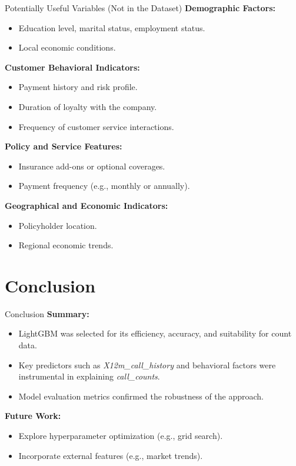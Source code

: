 \documentclass{beamer}\usepackage[]{graphicx}\usepackage[]{xcolor}
\begin{document}
\begin{frame}{Potentially Useful Variables (Not in the Dataset)}
\textbf{Demographic Factors:}
\begin{itemize}
    \item Education level, marital status, employment status.
    \item Local economic conditions.
\end{itemize}

\textbf{Customer Behavioral Indicators:}
\begin{itemize}
    \item Payment history and risk profile.
    \item Duration of loyalty with the company.
    \item Frequency of customer service interactions.
\end{itemize}

\textbf{Policy and Service Features:}
\begin{itemize}
    \item Insurance add-ons or optional coverages.
    \item Payment frequency (e.g., monthly or annually).
\end{itemize}

\textbf{Geographical and Economic Indicators:}
\begin{itemize}
    \item Policyholder location.
    \item Regional economic trends.
\end{itemize}
\end{frame}


\section{Conclusion}

\begin{frame}{Conclusion}
\textbf{Summary:}
\begin{itemize}
    \item LightGBM was selected for its efficiency, accuracy, and suitability for count data.
    \item Key predictors such as \textit{X12m\_call\_history} and behavioral factors were instrumental in explaining \textit{call\_counts}.
    \item Model evaluation metrics confirmed the robustness of the approach.
\end{itemize}

\textbf{Future Work:}
\begin{itemize}
    \item Explore hyperparameter optimization (e.g., grid search).
    \item Incorporate external features (e.g., market trends).
\end{itemize}
\end{frame}
\end{document}
